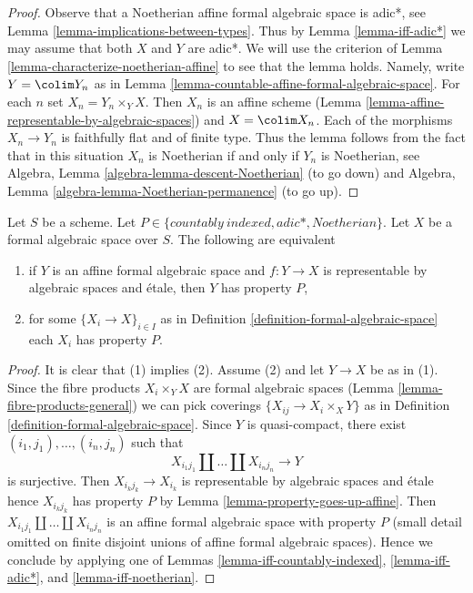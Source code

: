 \begin{proof}
Observe that a Noetherian affine formal algebraic space is adic*, see
Lemma \ref{lemma-implications-between-types}. Thus by
Lemma \ref{lemma-iff-adic*} we may assume that both $X$ and $Y$
are adic*. We will use the criterion of
Lemma \ref{lemma-characterize-noetherian-affine}
to see that the lemma holds. Namely, write $Y = \colim Y_n$
as in Lemma \ref{lemma-countable-affine-formal-algebraic-space}.
For each $n$ set $X_n = Y_n \times_Y X$. Then $X_n$ is an
affine scheme (Lemma \ref{lemma-affine-representable-by-algebraic-spaces})
and $X = \colim X_n$. Each of the morphisms $X_n \to Y_n$ is
faithfully flat and of finite type. Thus the lemma follows from the
fact that in this situation $X_n$ is Noetherian if and only if $Y_n$
is Noetherian, see
Algebra, Lemma \ref{algebra-lemma-descent-Noetherian} (to go down)
and
Algebra, Lemma \ref{algebra-lemma-Noetherian-permanence} (to go up).
\end{proof}

\begin{lemma}
\label{lemma-type-local}
Let $S$ be a scheme. Let $P \in \{countably\ indexed, adic*, Noetherian\}$.
Let $X$ be a formal algebraic space over $S$.
The following are equivalent
\begin{enumerate}
\item if $Y$ is an affine formal algebraic space and
$f : Y \to X$ is representable by algebraic spaces and \'etale,
then $Y$ has property $P$,
\item for some $\{X_i \to X\}_{i \in I}$ as in
Definition \ref{definition-formal-algebraic-space}
each $X_i$ has property $P$.
\end{enumerate}
\end{lemma}

\begin{proof}
It is clear that (1) implies (2). Assume (2) and let
$Y \to X$ be as in (1). Since the fibre products $X_i \times_Y X$
are formal algebraic spaces (Lemma \ref{lemma-fibre-products-general})
we can pick coverings $\{X_{ij} \to X_i \times_X Y\}$ as in
Definition \ref{definition-formal-algebraic-space}.
Since $Y$ is quasi-compact, there exist
$(i_1, j_1), \ldots, (i_n, j_n)$ such that
$$
X_{i_1 j_1} \amalg \ldots \amalg X_{i_n j_n} \longrightarrow Y
$$
is surjective. Then $X_{i_kj_k} \to X_{i_k}$ is representable
by algebraic spaces and \'etale hence $X_{i_kj_k}$ has property $P$ by
Lemma \ref{lemma-property-goes-up-affine}.
Then $X_{i_1 j_1} \amalg \ldots \amalg X_{i_n j_n}$ is an
affine formal algebraic space with property $P$ (small detail
omitted on finite disjoint unions of affine formal algebraic spaces).
Hence we conclude by applying one of
Lemmas \ref{lemma-iff-countably-indexed},
\ref{lemma-iff-adic*}, and
\ref{lemma-iff-noetherian}.
\end{proof}

